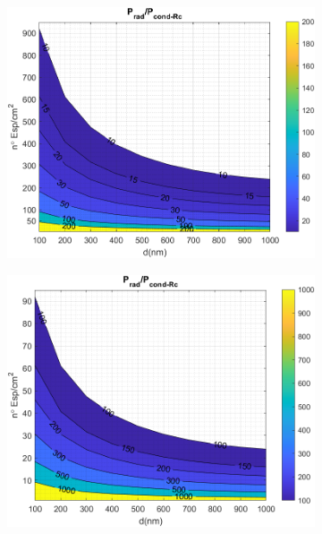 \begin{figure}[H]
	\centering
	\begin{subfigure}[b]{0.49\textwidth}
		\centering
		\includegraphics[width=1.00\textwidth]{figuras/Resultados/RelacionCondRad/SiGe_Rc_full_10.png}
		\caption{ }
		\label{fig:rel_SiSiO2Ge_Rc_full_10}
	\end{subfigure}
	\hfill
	\begin{subfigure}[b]{0.49\textwidth}
		\centering
		\includegraphics[width=1.00\textwidth]{figuras/Resultados/RelacionCondRad/SiGe_Rc_full_100.png}
		\caption{ }
		\label{fig:rel_SiSiO2Ge_Rc_full_100}
	\end{subfigure}
	\caption{ }
	\label{fig:relation_SiSiO2Ge_zoomIn}
\end{figure}
